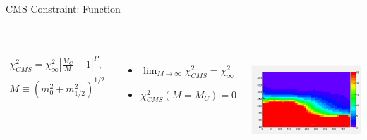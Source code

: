 \documentclass{beamer}
\begin{document}
\begin{frame}{CMS Constraint: Function}
\section{\insertframetitle}
  \begin{columns}[]
    \column{1.7in}
    \begin{eqnarray*}
      \chi^{2}_{CMS} = \chi^{2}_{\infty}\left|\frac{M_{C}}{M} - 1\right|^{P}, \\
      M\equiv \left(m_{0}^{2}+m_{1/2}^{2}\right)^{1/2}
    \end{eqnarray*}
    \begin{itemize}
      \item $\displaystyle\lim_{M\rightarrow\infty}\chi^{2}_{CMS}=\chi^{2}_{\infty}$
      \item $\chi^{2}_{CMS}\displaystyle({M=M_{C}}) = 0$
    \end{itemize}
    \column{2.0in}
    \includegraphics[height=3.5cm]{cms-lfunc.pdf}
  \end{columns}
\end{frame}
\end{document}
